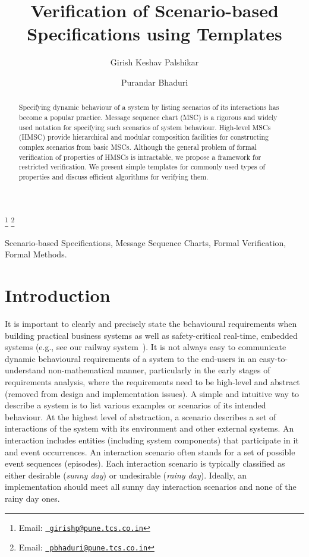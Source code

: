 \documentclass{entcs}
\begin{document}
\begin{frontmatter}
  \title{Verification of Scenario-based Specifications using Templates} 
  \author{Girish Keshav Palshikar }
  \author{Purandar Bhaduri }
  \address{Tata Research Development and Design Centre (TRDDC),\\ 
  54B, Hadapsar Industrial Estate, Pune 411013, India.}
  \thanks[myemail]{Email:
  \href{mailto:girishp@pune.tcs.co.in} {\texttt{\normalshape
        girishp@pune.tcs.co.in}}}
  \thanks[coemail]{Email:
    \href{mailto:pbhaduri@pune.tcs.co.in} {\texttt{\normalshape
        pbhaduri@pune.tcs.co.in}}}

\begin{abstract} 
Specifying dynamic behaviour of a system by listing scenarios of 
its interactions has become a popular practice. Message sequence 
chart (MSC) is a rigorous and widely used notation for specifying 
such scenarios of system behaviour. High-level MSCs (HMSC) 
provide hierarchical and modular composition facilities for 
constructing complex scenarios from basic MSCs. Although the 
general problem of formal verification of properties of HMSCs is 
intractable, we propose a framework for restricted verification. 
We present simple templates for commonly used types of properties 
and discuss efficient algorithms for verifying them.
\end{abstract}
\begin{keyword}
Scenario-based Specifications, Message Sequence Charts, 
Formal Verification, Formal Methods.
\end{keyword}
\end{frontmatter}

\section{Introduction}\label{intro}

It is important to clearly and precisely state the behavioural 
requirements when building practical business systems as well as 
safety-critical real-time, embedded systems (e.g., see our 
railway system~\cite{Girish03}). It is not always easy to communicate 
dynamic behavioural requirements of a system to the end-users 
in an easy-to-understand non-mathematical manner, particularly 
in the early stages of requirements analysis, where the 
requirements need to be high-level and abstract (removed from 
design and implementation issues). A simple and intuitive way 
to describe a system is to list various examples or scenarios 
of its intended behaviour. At the highest level of abstraction, 
a scenario describes a set of interactions of the system with 
its environment and other external systems. An interaction 
includes entities (including system components) that 
participate in it and event occurrences. An interaction 
scenario often stands for a set of possible event sequences 
(episodes). Each interaction scenario is typically classified 
as either desirable ({\em sunny day}) or undesirable ({\em rainy day}). 
Ideally, an implementation should meet all sunny day interaction 
scenarios and none of the rainy day ones.
\end{document}
